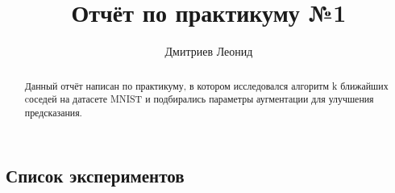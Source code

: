 \documentclass[10pt]{article}
\title{Отчёт по практикуму №1 }
\author{Дмитриев Леонид}
\begin{document}
	\maketitle
	
	\begin{abstract}
		\begin{center}
			Данный отчёт написан по практикуму, в котором исследовался алгоритм k ближайших
		    cоседей на датасете MNIST и подбирались параметры аугментации для улучшения предсказания.
		\end{center}
	\end{abstract}
	
	\begin{center} \section*{Список экспериментов} \end{center}
		
\end{document}
